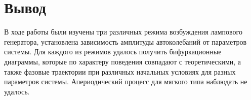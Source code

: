 


\section{Вывод}
В ходе работы были изучены три различных режима возбуждения лампового генератора, установлена зависимость амплитуды автоколебаний от параметров системы.
 Для каждого из режимов удалось получить бифуркационные диаграммы, которые по характеру поведения совпадают с теоретическими, а также фазовые траектории при 
 различных начальных условиях для разных параметров системы. Апериодический процесс для мягкого типа наблюдать не удалось. 



